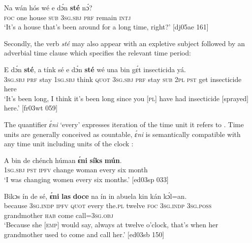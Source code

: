\ea%
    \label{ex:key:1035}
    \gll Na  wán  hós    wé  e    dɔ́n  \textbf{sté}    nɔ́?\\
\textsc{foc}  one  house  \textsc{sub}  \textsc{3sg.sbj}  \textsc{prf}  remain  \textsc{intj}\\

\glt ‘It’s a house that’s been around for a long time, right?’ [dj05ae 161]
\z

Secondly, the verb \textit{sté} may also appear with an expletive subject followed by an adverbial time clause which specifies the relevant time period:


\ea%
    \label{ex:key:1036}
    \gll E    dɔ́n  \textbf{sté},  a    tínk    sé    e    dɔ́n  \textbf{sté}
wé  una  bin  gɛ́t  insecticida  yá.\\
\textsc{3sg.sbj}  \textsc{prf}  stay  \textsc{1sg.sbj}  think  \textsc{quot}    \textsc{3sg.sbj}  \textsc{prf}  stay
\textsc{sub}  \textsc{2pl}  \textsc{pst}  get  insecticide  here\\

\glt ‘It’s been long, I think it’s been long since you [\textsc{pl}] have had insecticide 
[sprayed] here.’ [fr03wt 059]
\z

The quantifier{\fff} \textit{ɛ́ni} ‘every’ expresses iteration of the time unit it refers to . Time units are generally conceived as countable, \textit{ɛ́ni} is semantically compatible with any time unit including units of the clock :


\ea%
    \label{ex:key:1037}
    \gll A    bin  de  chénch  húman  \textbf{ɛ́ni}    \textbf{síks}  \textbf{mún}.\\
\textsc{1sg.sbj}  \textsc{pst}  \textsc{ipfv}  change  woman  every  six  month\\

\glt ‘I was changing women every six months.’ [ed03sp 033]
\z


\ea%
    \label{ex:key:1038}
    \gll Bikɔs  ín    de  sé,    \textbf{ɛ́ni}    \textbf{las}    \textbf{doce}  na  ín
in    abuela    kin  kán    kɔ́l=an.\\
because  \textsc{3sg.indp}  \textsc{ipfv}  \textsc{quot}    every  the.\textsc{pl}  twelve  \textsc{foc}  \textsc{3sg.indp}
\textsc{3sg.poss}  grandmother  \textsc{hab}  come  call=\textsc{3sg.obj}\\

\glt ‘Because she [\textsc{emp}] would say, always at twelve o’clock, that’s when her 
grandmother used to come and call her.’ [ed03sb 150]
\z

